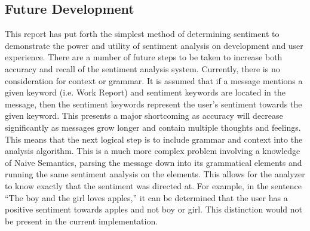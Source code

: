 \newpage
\subsection{Future Development} %
\label{sub:future_development}
This report has put forth the simplest method of determining sentiment to demonstrate the power and utility of sentiment analysis on development and user experience.  There are a number of future steps to be taken to increase both accuracy and recall of the sentiment analysis system.  Currently, there is no consideration for context or grammar.  It is assumed that if a message mentions a given keyword (i.e. Work Report) and sentiment keywords are located in the message, then the sentiment keywords represent the user's sentiment towards the given keyword.  This presents a major shortcoming as accuracy will decrease significantly as messages grow longer and contain multiple thoughts and feelings.  This means that the next logical step is to include grammar and context into the analysis algorithm. This is a much more complex problem involving a knowledge of Naive Semantics\cite{dahlgreen}, parsing the message down into its grammatical elements \cite{rayner} and running the same sentiment analysis on the elements.  This allows for the analyzer to know exactly that the sentiment was directed at.  For example, in the sentence ``The boy and the girl loves apples,'' it can be determined that the user has a positive sentiment towards apples and not boy or girl.  This distinction would not be present in the current implementation.
